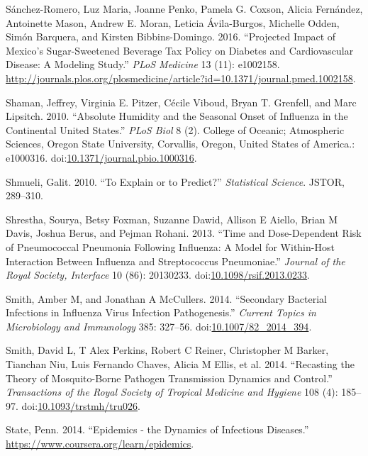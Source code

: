 \documentclass[]{book}
\theoremstyle{definition}
\theoremstyle{definition}
\theoremstyle{definition}
\theoremstyle{remark}
\begin{document}
\hypertarget{ref-sanchez-romero16}{}
Sánchez-Romero, Luz Maria, Joanne Penko, Pamela G. Coxson, Alicia
Fernández, Antoinette Mason, Andrew E. Moran, Leticia Ávila-Burgos,
Michelle Odden, Simón Barquera, and Kirsten Bibbins-Domingo. 2016.
``Projected Impact of Mexico's Sugar-Sweetened Beverage Tax Policy on
Diabetes and Cardiovascular Disease: A Modeling Study.'' \emph{PLoS
Medicine} 13 (11): e1002158.
\url{http://journals.plos.org/plosmedicine/article?id=10.1371/journal.pmed.1002158}.

\hypertarget{ref-shaman10}{}
Shaman, Jeffrey, Virginia E. Pitzer, Cécile Viboud, Bryan T. Grenfell,
and Marc Lipsitch. 2010. ``Absolute Humidity and the Seasonal Onset of
Influenza in the Continental United States.'' \emph{PLoS Biol} 8 (2).
College of Oceanic; Atmospheric Sciences, Oregon State University,
Corvallis, Oregon, United States of America.: e1000316.
doi:\href{https://doi.org/10.1371/journal.pbio.1000316}{10.1371/journal.pbio.1000316}.

\hypertarget{ref-shmueli10}{}
Shmueli, Galit. 2010. ``To Explain or to Predict?'' \emph{Statistical
Science}. JSTOR, 289--310.

\hypertarget{ref-shrestha13}{}
Shrestha, Sourya, Betsy Foxman, Suzanne Dawid, Allison E Aiello, Brian M
Davis, Joshua Berus, and Pejman Rohani. 2013. ``Time and Dose-Dependent
Risk of Pneumococcal Pneumonia Following Influenza: A Model for
Within-Host Interaction Between Influenza and Streptococcus
Pneumoniae.'' \emph{Journal of the Royal Society, Interface} 10 (86):
20130233.
doi:\href{https://doi.org/10.1098/rsif.2013.0233}{10.1098/rsif.2013.0233}.

\hypertarget{ref-smith14a}{}
Smith, Amber M, and Jonathan A McCullers. 2014. ``Secondary Bacterial
Infections in Influenza Virus Infection Pathogenesis.'' \emph{Current
Topics in Microbiology and Immunology} 385: 327--56.
doi:\href{https://doi.org/10.1007/82_2014_394}{10.1007/82\_2014\_394}.

\hypertarget{ref-smith14}{}
Smith, David L, T Alex Perkins, Robert C Reiner, Christopher M Barker,
Tianchan Niu, Luis Fernando Chaves, Alicia M Ellis, et al. 2014.
``Recasting the Theory of Mosquito-Borne Pathogen Transmission Dynamics
and Control.'' \emph{Transactions of the Royal Society of Tropical
Medicine and Hygiene} 108 (4): 185--97.
doi:\href{https://doi.org/10.1093/trstmh/tru026}{10.1093/trstmh/tru026}.

\hypertarget{ref-epimooc}{}
State, Penn. 2014. ``Epidemics - the Dynamics of Infectious Diseases.''
\url{https://www.coursera.org/learn/epidemics}.
\end{document}
